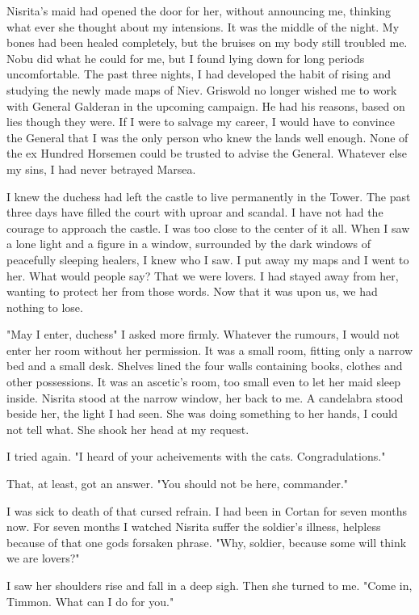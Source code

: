 \documentclass{article}
\begin{document}
Nisrita's maid had opened the door for her, without announcing me, thinking what ever she thought about my intensions. It was the middle of the night. My bones had been healed completely, but the bruises on my body still troubled me. Nobu did what he could for me, but I found lying down for long periods uncomfortable. The past three nights, I had developed the habit of rising and studying the newly made maps of Niev. Griswold no longer wished me to work with General Galderan in the upcoming campaign. He had his reasons, based on lies though they were. If I were to salvage my career, I would have to convince the General that I was the only person who knew the lands well enough. None of the ex Hundred Horsemen could be trusted to advise the General. Whatever else my sins, I had never betrayed Marsea. 

I knew the duchess had left the castle to live permanently in the Tower. The past three days have filled the court with uproar and scandal. I have not had the courage to approach the castle. I was too close to the center of it all. When I saw a lone light and a figure in a window, surrounded by the dark windows of peacefully sleeping healers, I knew who I saw. I put away my maps and I went to her. What would people say? That we were lovers. I had stayed away from her, wanting to protect her from those words. Now that it was upon us, we had nothing to lose. 

"May I enter, duchess" I asked more firmly. Whatever the rumours, I would not enter her room without her permission. It was a small room, fitting only a narrow bed and a small desk. Shelves lined the four walls containing books, clothes and other possessions. It was an ascetic's room, too small even to let her maid sleep inside. Nisrita stood at the narrow window, her back to me. A candelabra stood beside her, the light I had seen. She was doing something to her hands, I could not tell what. She shook her head at my request.

I tried again. "I heard of your acheivements with the cats. Congradulations."

That, at least, got an answer. "You should not be here, commander." 

I was sick to death of that cursed refrain. I had been in Cortan for seven months now. For seven months I watched Nisrita suffer the soldier's illness, helpless because of that one gods forsaken phrase. "Why, soldier, because some will think we are lovers?"

I saw her shoulders rise and fall in a deep sigh. Then she turned to me. "Come in, Timmon. What can I do for you."
\end{document}
